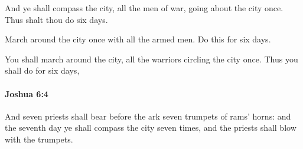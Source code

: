 			\begin{versebox}
					\item[BHS] 
					\item[ASV] And ye shall compass the city, all the men of war, going about the city once. Thus shalt thou do six days.
					\item[NIV] March around the city once with all the armed men. Do this for six days.
					\item[NRSV] You shall march around the city, all the warriors circling the city once. Thus you shall do for six days,
			\end{versebox}

		\paragraph{Joshua 6:4} %
			\label{JOSHUA-6-4}

			And seven priests shall bear before the ark seven trumpets of rams’ horns: and the seventh day ye shall compass the city seven times, and the priests shall blow with the trumpets.


